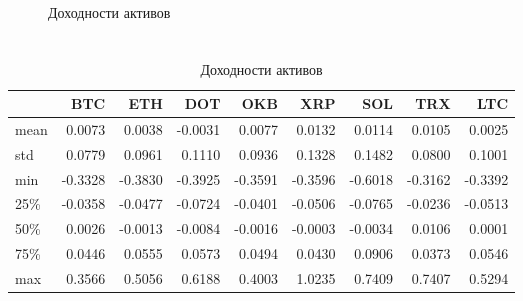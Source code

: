 \documentclass{beamer}
\begin{document}
\begin{frame}
\begin{columns}
\begin{column}{0.5\textwidth}
\begin{figure}
                \caption{Доходности активов}
                \label{fig:returns}
            \end{figure}
        \end{column}
    \end{columns}
\end{frame}

\begin{frame}
    \frametitle{}
    \begin{table}[h]
        \caption{Доходности активов}
        \setlength{\tabcolsep}{3pt}
        \begin{tabularx}{\textwidth}{lrrrrrrrr}
            \toprule
            & BTC & ETH & DOT & OKB & XRP & SOL & TRX & LTC \\
            \midrule
            mean & 0.0073 & 0.0038 & -0.0031 & 0.0077 & 0.0132 & 0.0114 & 0.0105 & 0.0025 \\
            std & 0.0779 & 0.0961 & 0.1110 & 0.0936 & 0.1328 & 0.1482 & 0.0800 & 0.1001 \\
            min & -0.3328 & -0.3830 & -0.3925 & -0.3591 & -0.3596 & -0.6018 & -0.3162 & -0.3392 \\
            25\% & -0.0358 & -0.0477 & -0.0724 & -0.0401 & -0.0506 & -0.0765 & -0.0236 & -0.0513 \\
            50\% & 0.0026 & -0.0013 & -0.0084 & -0.0016 & -0.0003 & -0.0034 & 0.0106 & 0.0001 \\
            75\% & 0.0446 & 0.0555 & 0.0573 & 0.0494 & 0.0430 & 0.0906 & 0.0373 & 0.0546 \\
            max & 0.3566 & 0.5056 & 0.6188 & 0.4003 & 1.0235 & 0.7409 & 0.7407 & 0.5294 \\
            \bottomrule
        \end{tabularx}
        \label{tab:returns_describe}
    \end{table}
\end{frame}
\end{document}
